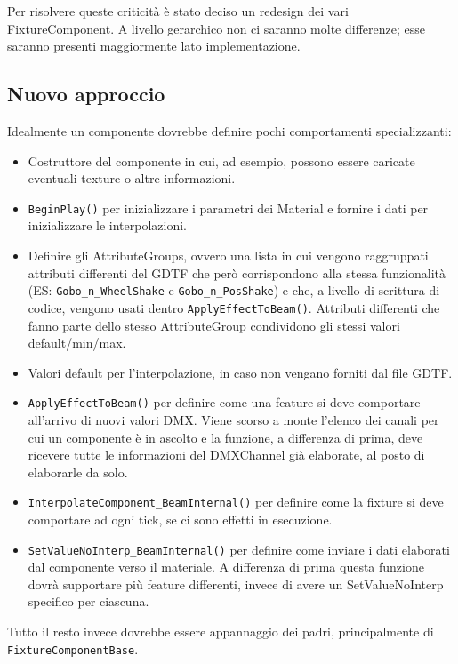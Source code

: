 \documentclass[main.tex]{subfiles}
\begin{document}
Per risolvere queste criticità è stato deciso un redesign dei vari FixtureComponent. A livello gerarchico non ci saranno molte differenze; esse saranno presenti maggiormente lato implementazione.

\subsection{Nuovo approccio}\label{subsec:3_idea}
Idealmente un componente dovrebbe definire pochi comportamenti specializzanti:
\begin{itemize}
    \item Costruttore del componente in cui, ad esempio, possono essere caricate eventuali texture o altre informazioni.
    \item \lstinline{BeginPlay()} per inizializzare i parametri dei Material e fornire i dati per inizializzare le interpolazioni.
    \item Definire gli AttributeGroups, ovvero una lista in cui vengono raggruppati attributi differenti del GDTF che però corrispondono alla stessa funzionalità (ES: \lstinline{Gobo_n_WheelShake} e \lstinline{Gobo_n_PosShake}) e che, a livello di scrittura di codice, vengono usati  dentro \lstinline{ApplyEffectToBeam()}. Attributi differenti che fanno parte dello stesso AttributeGroup condividono gli stessi valori default/min/max.
    \item Valori default per l'interpolazione, in caso non vengano forniti dal file GDTF.
    \item \lstinline{ApplyEffectToBeam()} per definire come una feature si deve comportare all'arrivo di nuovi valori DMX. Viene scorso a monte l'elenco dei canali per cui un componente è in ascolto e la funzione, a differenza di prima, deve ricevere tutte le informazioni del DMXChannel già elaborate, al posto di elaborarle da solo. 
    \item \lstinline{InterpolateComponent_BeamInternal()} per definire come la fixture si deve comportare ad ogni tick, se ci sono effetti in esecuzione.
    \item \lstinline{SetValueNoInterp_BeamInternal()} per definire come inviare i dati elaborati dal componente verso il materiale. A differenza di prima questa funzione dovrà supportare più feature differenti, invece di avere un SetValueNoInterp specifico per ciascuna.
\end{itemize}

\noindent Tutto il resto invece dovrebbe essere appannaggio  dei padri, principalmente di \lstinline{FixtureComponentBase}. \newline
\end{document}
